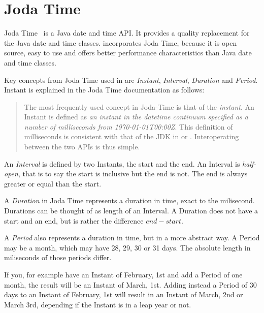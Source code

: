 \section{Joda Time}
Joda Time~\cite{jodatime} is a Java date and time API.
It provides a quality replacement for the Java date and time classes.
\salespoint{} incorporates Joda Time, because it is open source, easy to use and offers better performance characteristics than Java date and time classes.

Key concepts from Joda Time used in \salespoint{} are \textit{Instant}, \textit{Interval}, \textit{Duration} and \textit{Period}.
Instant is explained in the Joda Time documentation as follows:
\begin{quote}
The most frequently used concept in Joda-Time is that of the \textit{instant}.
An Instant is defined as \textit{an instant in the datetime continuum specified as a number of milliseconds from 1970-01-01T00:00Z}.
This definition of milliseconds is consistent with that of the JDK in  or .
Interoperating between the two APIs is thus simple.
\end{quote}

An \textit{Interval} is defined by two Instants, the start and the end.
An Interval is \textit{half-open}, that is to say the start is inclusive but the end is not.
The end is always greater or equal than the start.

A \textit{Duration} in Joda Time represents a duration in time, exact to the milisecond.
Durations can be thought of as length of an Interval.
A Duration does not have a start and an end, but is rather the difference $end - start$.

A \textit{Period} also represents a duration in time, but in a more abstract way.
A Period may be a month, which may have 28, 29, 30 or 31 days. The absolute length in miliseconds of those periods differ.

If you, for example have an Instant of February, 1st and add a Period of one month, the result will be an Instant of March, 1st.
Adding instead a Period of 30 days to an Instant of February, 1st will result in an Instant of March, 2nd or March 3rd, depending if the Instant is in a leap year or not.
